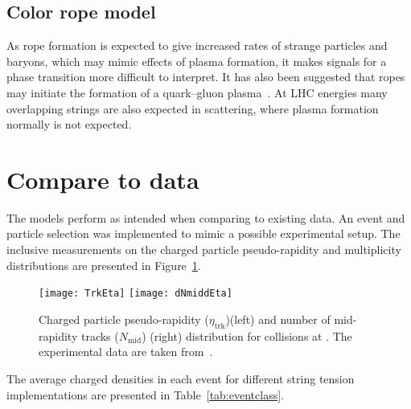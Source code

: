 \documentclass[ALICE,manyauthors]{StrinJet}
\begin{document}
\subsection{Color rope model}
\label{subsec:rope}

As rope formation is expected to give increased rates of strange particles and baryons, which may mimic effects of plasma formation, it makes signals for a phase transition more difficult to interpret.
It has also been suggested that ropes may initiate the formation of a quark–gluon plasma~\cite{Gyulassy:1985oqt, Kajantie:1985jh, Gatoff:1987uf, Braun:1997ch}.
At LHC energies many overlapping strings are also expected in \pp scattering, where plasma formation normally is not expected.

\section{Compare to data}
\label{sec:com2da}
The models perform as intended when comparing to existing data. An event and particle selection was implemented to mimic a possible experimental setup.
The inclusive measurements on the charged particle pseudo-rapidity and multiplicity distributions are presented in Figure~\ref{fig:trkinfo}.
\begin{figure}[htp]
	\begin{center}
		\texttt{[image: TrkEta]}
		\texttt{[image: dNmiddEta]}
	\end{center}
	\caption{Charged particle pseudo-rapidity ($\eta_\mathrm{trk}$)(left) and number of mid-rapidity tracks ($N_\mathrm{mid}$) (right) distribution for \pp collisions at \seven.  The experimental data are taken from~\cite{ALICE:2010mty}.}
	\label{fig:trkinfo}
\end{figure}

The average charged densities in each event for different string tension implementations are presented in Table~\ref{tab:eventclass}.
\end{document}
